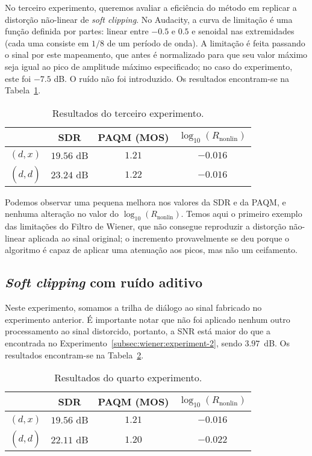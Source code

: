 No terceiro experimento, queremos avaliar a eficiência do método em replicar a
distorção não-linear de \textit{soft clipping}. No Audacity, a curva de limitação é uma
função definida por partes: linear entre $-0.5$ e $0.5$ e senoidal nas extremidades
(cada uma consiste em $1/8$ de um período de onda). A limitação é feita passando o
sinal por este mapeamento, que antes é normalizado para que seu valor máximo seja igual
ao pico de amplitude máximo especificado; no caso do experimento, este foi $-7.5$ dB. O
ruído não foi introduzido. Os resultados encontram-se na
Tabela~\ref{tab:wf:experiment-3}. {\def\arraystretch{1.25}\tabcolsep=10pt
\begin{table}[!ht]
	\centering
	\caption[Resultados do terceiro experimento: \textit{soft clipping}]{Resultados do terceiro experimento.}
	\label{tab:wf:experiment-3}
	\begin{tabular}{cccc}
		\toprule
		               & SDR        & PAQM (MOS) & $\log_{10}(R_{\text{nonlin}})$ \\
		\midrule
		$(d, x)$       & $19.56$ dB & $1.21$     & $-0.016$                       \\
		$(d, \hat{d})$ & $23.24$ dB & $1.22$     & $-0.016$                       \\ \bottomrule
	\end{tabular}
\end{table}
}

Podemos observar uma pequena melhora nos valores da SDR e da PAQM, e nenhuma alteração
no valor do $\log_{10}(R_{\text{nonlin}})$. Temos aqui o primeiro exemplo das
limitações do Filtro de Wiener, que não consegue reproduzir a distorção não-linear
aplicada ao sinal original; o incremento provavelmente se deu porque o algoritmo é
capaz de aplicar uma atenuação aos picos, mas não um ceifamento.

\subsection{\textit{Soft clipping} com ruído aditivo}

Neste experimento, somamos a trilha de diálogo ao sinal fabricado no experimento
anterior. É importante notar que não foi aplicado nenhum outro processamento ao sinal
distorcido, portanto, a SNR está maior do que a encontrada no
Experimento~\ref{subsec:wiener:experiment-2}, sendo $3.97$~dB. Os resultados
encontram-se na Tabela~\ref{tab:wf:experiment-4}.
{\def\arraystretch{1.25}\tabcolsep=10pt
\begin{table}[!ht]
	\centering
	\caption[Resultados do quarto experimento: \textit{soft clipping} com ruído aditivo]{Resultados do quarto experimento.}
	\label{tab:wf:experiment-4}
	\begin{tabular}{cccc}
		\toprule
		               & SDR        & PAQM (MOS) & $\log_{10}(R_{\text{nonlin}})$ \\
		\midrule
		$(d, x)$       & $19.56$ dB & $1.21$     & $-0.016$                       \\
		$(d, \hat{d})$ & $22.11$ dB & $1.20$     & $-0.022$                       \\ \bottomrule
	\end{tabular}
\end{table}
}

